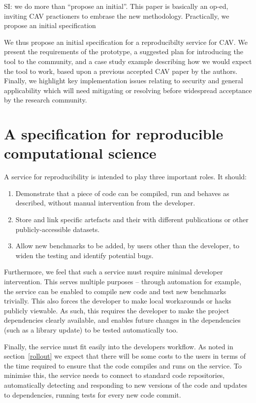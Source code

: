 \documentclass{llncs}
\begin{document}
SI: we do more than ``propose an initial''. This paper is basically an
op-ed, inviting CAV practioners to embrase the new methodology. Practically,
we propose an initial specification

We thus propose an initial specification for a reproducibilty
service for CAV. We present the requirements of the prototype, a suggested
plan for introducing the tool to the community, and a case study
example describing how we would expect the tool to work, based upon a
previous accepted CAV paper by the authors. Finally, we highlight key
implementation issues relating to security and general applicability
which will need mitigating or resolving before widespread acceptance
by the research community.

\section{A specification for reproducible computational science}\label{spec}

A service for reproducibility is intended to play three important roles. It should:
\begin{enumerate}
	\item Demonstrate that a piece of code can be compiled, run and behaves as described,
		without manual intervention from the developer.
	\item Store and link specific artefacts and their with different publications
		or other publicly-accessible datasets.
	\item Allow new benchmarks to be added, by users other than the developer, to 
		widen the testing and identify potential bugs.
\end{enumerate}
 
Furthermore, we feel that such a service must require minimal
developer intervention.  This serves multiple purposes -- through
automation for example, the service can be enabled to compile new code
and test new benchmarks trivially. This also forces the developer to
make local workarounds or hacks publicly viewable. As such, this
requires the developer to make the project dependencies clearly
available, and enables future changes in the dependencies (such as a
library update) to be tested automatically too.

Finally, the service must fit easily into the developers workflow. As
noted in section~\ref{rollout} we expect that there will be some costs
to the users in terms of the time required to ensure that the code
compiles and runs on the service. To minimise this, the service needs
to connect to standard code repositories, automatically detecting and
responding to new versions of the code and updates to dependencies,
running tests for every new code commit.
\end{document}
